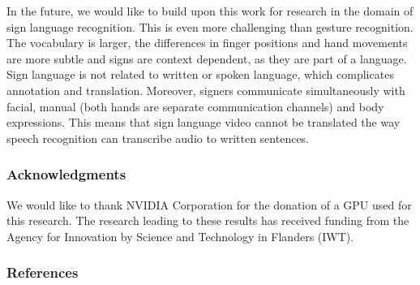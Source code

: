 \documentclass[11pt,a4paper]{article} \usepackage{a4wide}
\begin{document}
In the future, we would like to build upon this work for research in the domain of sign language recognition.
This is even more challenging than gesture recognition. The vocabulary is larger, the differences in finger positions and hand movements are more subtle and signs are context dependent, as they are part of a language. Sign language is not related to written or spoken language, which complicates annotation and translation. Moreover, signers communicate simultaneously with facial, manual (both hands are separate communication channels) and body expressions. This means that sign language video cannot be translated the way speech recognition can transcribe audio to written sentences.



\subsubsection*{Acknowledgments}
We would like to thank NVIDIA Corporation for the donation of a GPU used for this research.
The research leading to these results has received funding from the Agency for Innovation by Science and Technology in Flanders (IWT).

\subsubsection*{References}
\renewcommand{\section}[2]{}

\end{document}
